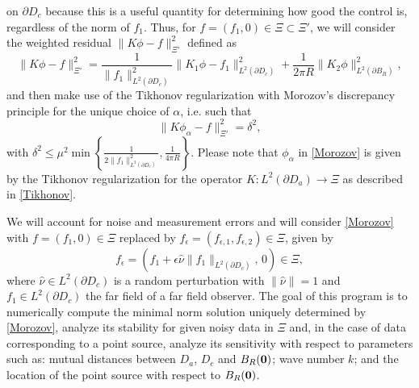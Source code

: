 \documentclass[11pt]{amsart}
\theoremstyle{definition}
\theoremstyle{definition}
\theoremstyle{definition}
\def\B0{{\bf 0}}
\begin{document}
on $\partial D_{c}$ because this is a useful quantity for determining how good the control is, regardless of the norm of $f_{1}$. Thus, for $f=(f_1,0)\in \Xi \subset \Xi'$, we will consider the weighted residual $\|K\phi - f\|_{\Xi'}^{2}$ defined as  
\begin{equation}
\label{disc-fun}
\|K\phi - f\|_{\Xi'}^{2} = \displaystyle\frac{1}{\|f_{1}\|_{L^{2}(\partial D_{c})}^{2}}\| K_1\phi  - f_{1}\|_{L^{2}(\partial D_{c})}^{2} + \frac{1}{2\pi R} \|K_2\phi \|_{L^{2}(\partial B_{R})}^{2},
\end{equation}
and then make use of the Tikhonov regularization with Morozov's discrepancy principle for the unique choice of $\alpha$, i.e. such that
\begin{equation}
\label{Morozov}
\|K\phi_\alpha - f\|_{\Xi'}^{2} =\delta^2,
\end{equation}
with $\displaystyle\delta^2\leq \mu^2\min\left\{\frac{1}{2\|f_{1}\|^2_{L^{2}(\partial D_{c})}}, \frac{1}{4\pi R}\right\}$.
Please note that $\phi_\alpha$ in \eqref{Morozov} is given by the Tikhonov regularization for the operator  $K:L^2(\partial D_a)\rightarrow \Xi$ as described in \eqref{Tikhonov}. 

We will account for noise and measurement errors and will consider \eqref{Morozov} with $f=(f_1,0)\in \Xi$ replaced by $f_\epsilon=(f_{\epsilon,1}, f_{\epsilon,2})\in \Xi$, given by 
\begin{equation}
\label{random-f}
f_{\epsilon} = (f_{1} + \epsilon \widehat{\nu}\|f_{1}\|_{L^{2}(\partial D_{c})}, \, 0)\in \Xi,
\end{equation} 
where $\widehat{\nu} \in L^{2}(\partial D_{c})$ is a random perturbation with $\|\widehat{\nu}\| = 1$ and $f_{1} \in L^{2}(\partial D_{c})$ the far field of a far field observer. The goal of this program is to numerically compute the minimal norm solution uniquely determined by \eqref{Morozov}, analyze its stability for given noisy data in $\Xi$ and, in the case of data corresponding to a point source, analyze its sensitivity with respect to parameters such as: mutual distances between $D_a$, $D_c$ and $B_R(\B0)$; wave number $k$; and the location of the point source with respect to $B_R(\B0)$.
\end{document}
